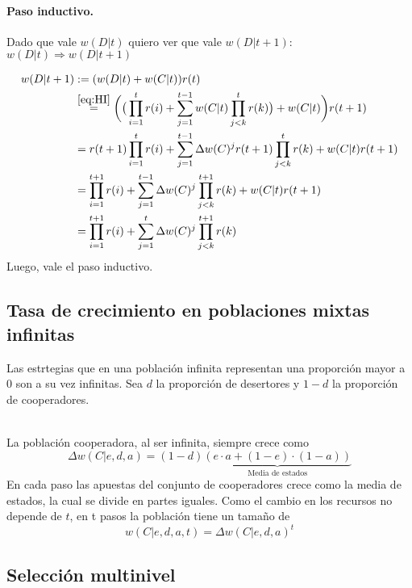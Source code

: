 \documentclass[a4paper,10pt]{article}
\begin{document}
\paragraph{Paso inductivo.} Dado que vale $w(D|t)$ quiero ver que vale $w(D|t+1)$: $w(D|t) \Rightarrow w(D|t+1)$

\begin{equation}
\begin{split}
w(D|t+1) &:= (w(D|t) + w(C|t)) r(t)  \\
& \overset{\ref{eq:HI}}{=} \bigg( \big(\prod^t_{i=1} r(i) + \sum^{t-1}_{j=1} w(C|t) \prod^t_{j<k} r(k) \big)+ w(C|t) \bigg) r(t+1) \\
& = r(t+1) \prod^t_{i=1} r(i) + \sum^{t-1}_{j=1} \Delta w(C)^j r(t+1) \prod^t_{j<k} r(k) + w(C|t)  r(t+1) \\ 
& = \prod^{t+1}_{i=1} r(i) + \sum^{t-1}_{j=1} \Delta w(C)^j  \prod^{t+1}_{j<k} r(k) + w(C|t)  r(t+1)  \\
& = \prod^{t+1}_{i=1} r(i) + \sum^t_{j=1} \Delta w(C)^j  \prod^{t+1}_{j<k} r(k) 
\end{split}
\end{equation}
Luego, vale el paso inductivo. 




\subsection{Tasa de crecimiento en poblaciones mixtas infinitas}

Las estrtegias que en una población infinita representan una proporción mayor a $0$ son a su vez infinitas.
Sea $d$ la proporción de desertores y $1-d$ la proporción de cooperadores.

\\

La población cooperadora, al ser infinita, siempre crece como
\begin{equation}
\Delta w(C|e,d,a) = (1-d) \underbrace{(e\cdot a + (1-e)\cdot(1-a))}_{\text{Media de estados}}
\end{equation}
En cada paso las apuestas del conjunto de cooperadores crece como la media de estados, la cual se divide en partes iguales.
Como el cambio en los recursos no depende de $t$, en t pasos la población tiene un tamaño de
\begin{equation}
w(C|e,d,a,t) = \Delta w(C|e,d,a)^t 
\end{equation}


\subsection{Selección multinivel}
\end{document}
